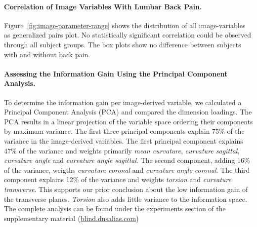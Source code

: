 \documentclass[a4paper,twoside]{style/article}
\begin{document}
\paragraph{Correlation of Image Variables With Lumbar Back Pain.}
Figure~\ref{fig:image-parameter-range} shows the distribution of all image-variables as generalized pairs plot.
No statistically significant correlation could be observed through all subject groups.
The box plots show no difference between subjects with and without back pain.

\paragraph{Assessing the Information Gain Using the Principal Component Analysis.}
To determine the information gain per image-derived variable, we calculated a Principal Component Analysis (PCA) and compared the dimension loadings.
The PCA results in a linear projection of the variable space ordering their components by maximum variance.
The first three principal components explain 75\% of the variance in the image-derived variables.
The first principal component explains 47\% of the variance and weights primarily \emph{mean curvature}, \emph{curvature sagittal}, \emph{curvature angle} and \emph{curvature angle sagittal}.
The second component, adding 16\% of the variance, weigths  \emph{curvature coronal} and \emph{curvature angle coronal}.
The third component explains 12\% of the variance and weights \emph{torsion} and \emph{curvature transverse}.
This supports our prior conclusion about the low information gain of the transverse planes.
\emph{Torsion} also adds little variance to the information space.
The complete analysis can be found under the experiments section of the supplementary material (\url{blind.dnsalias.com})
\end{document}
